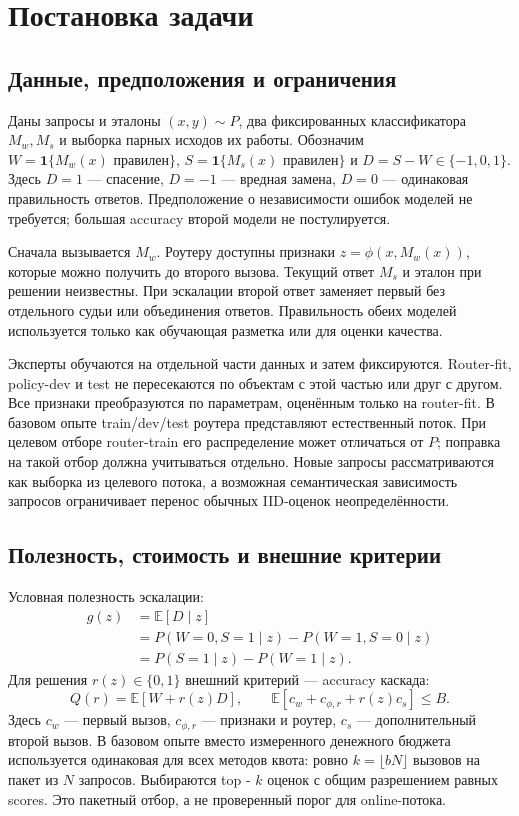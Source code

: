 \section{Постановка задачи}
\subsection{Данные, предположения и ограничения}
Даны запросы и эталоны $(x,y)\sim P$, два фиксированных классификатора
$M_w,M_s$ и выборка парных исходов их работы.
Обозначим $W=\mathbf1\{M_w(x)\text{ правилен}\}$,
$S=\mathbf1\{M_s(x)\text{ правилен}\}$ и $D=S-W\in\{-1,0,1\}$.
Здесь $D=1$ --- спасение, $D=-1$ --- вредная замена,
$D=0$ --- одинаковая правильность ответов. Предположение о независимости
ошибок моделей не требуется; большая accuracy второй модели не постулируется.

Сначала вызывается $M_w$. Роутеру доступны признаки
$z=\phi(x,M_w(x))$, которые можно получить до второго вызова.
Текущий ответ $M_s$ и эталон при решении неизвестны. При эскалации
второй ответ заменяет первый без отдельного судьи или объединения ответов.
Правильность обеих моделей используется только как обучающая разметка
или для оценки качества.

Эксперты обучаются на отдельной части данных и затем фиксируются.
Router-fit, policy-dev и test не пересекаются по объектам с этой частью
или друг с другом. Все признаки преобразуются по параметрам, оценённым
только на router-fit. В базовом опыте train/dev/test роутера представляют
естественный поток. При целевом отборе router-train его распределение
может отличаться от $P$; поправка на такой отбор должна учитываться
отдельно. Новые запросы рассматриваются как выборка из целевого потока,
а возможная семантическая зависимость запросов ограничивает перенос
обычных IID-оценок неопределённости.

\subsection{Полезность, стоимость и внешние критерии}
Условная полезность эскалации:
\begin{equation}\label{eq:gain}
\begin{aligned}
g(z)&=\mathbb E[D\mid z]\\
&=P(W=0,S=1\mid z)-P(W=1,S=0\mid z)\\
&=P(S=1\mid z)-P(W=1\mid z).
\end{aligned}
\end{equation}
Для решения $r(z)\in\{0,1\}$ внешний критерий --- accuracy каскада:
\begin{equation}\label{eq:quality}
 Q(r)=\mathbb E[W+r(z)D],\qquad
 \mathbb E[c_w+c_{\phi,r}+r(z)c_s]\le B.
\end{equation}
Здесь $c_w$ --- первый вызов, $c_{\phi,r}$ --- признаки и роутер,
$c_s$ --- дополнительный второй вызов. В базовом опыте вместо
измеренного денежного бюджета используется одинаковая для всех методов
квота: ровно $k=\lfloor bN\rfloor$ вызовов на пакет из $N$ запросов.
Выбираются top - $k$ оценок с общим разрешением равных scores.
Это пакетный отбор, а не проверенный порог для online-потока.

